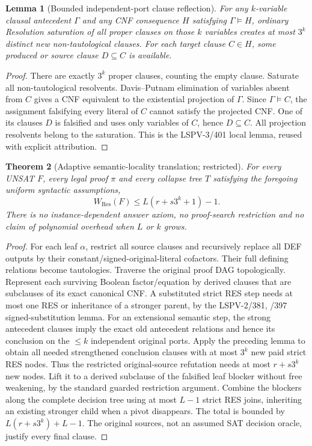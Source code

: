\documentclass[11pt]{article}
\newtheorem{theorem}{Theorem}
\newtheorem{lemma}[theorem]{Lemma}
\begin{document}
\begin{lemma}[Bounded independent-port clause reflection]
For any \(k\)-variable clausal antecedent \(\Gamma\) and any CNF consequence \(H\) satisfying \(\Gamma\models H\), ordinary Resolution saturation of all proper clauses on those \(k\) variables creates at most \(3^k\) distinct new non-tautological clauses. For each target clause \(C\in H\), some produced or source clause \(D\subseteq C\) is available.
\end{lemma}
\begin{proof} There are exactly \(3^k\) proper clauses, counting the empty clause. Saturate all non-tautological resolvents. Davis--Putnam elimination of variables absent from \(C\) gives a CNF equivalent to the existential projection of \(\Gamma\). Since \(\Gamma\models C\), the assignment falsifying every literal of \(C\) cannot satisfy the projected CNF. One of its clauses \(D\) is falsified and uses only variables of \(C\), hence \(D\subseteq C\). All projection resolvents belong to the saturation. This is the LSPV-3/401 local lemma, reused with explicit attribution.
\end{proof}

\begin{theorem}[Adaptive semantic-locality translation; restricted]
For \emph{every} UNSAT \(F\), \emph{every} legal proof \(\pi\) and \emph{every} collapse tree \(T\) satisfying the foregoing uniform syntactic assumptions,
\[
\boxed{W_{\mathrm{Res}}(F)\le L(r+s3^k+1)-1.}
\]
There is no instance-dependent answer axiom, no proof-search restriction and no claim of polynomial overhead when \(L\) or \(k\) grows.
\end{theorem}
\begin{proof} For each leaf \(\alpha\), restrict all source clauses and recursively replace all DEF outputs by their constant/signed-original-literal cofactors. Their full defining relations become tautologies. Traverse the original proof DAG topologically. Represent each surviving Boolean factor/equation by derived clauses that are subclauses of its exact canonical CNF. A substituted strict RES step needs at most one RES or inheritance of a stronger parent, by the LSPV-2/381, /397 signed-substitution lemma. For an extensional semantic step, the strong antecedent clauses imply the exact old antecedent relations and hence its conclusion on the \(\le k\) independent original ports. Apply the preceding lemma to obtain all needed strengthened conclusion clauses with at most \(3^k\) new paid strict RES nodes. Thus the restricted original-source refutation needs at most \(r+s3^k\) new nodes. Lift it to a derived subclause of the falsified leaf blocker without free weakening, by the standard guarded restriction argument. Combine the blockers along the complete decision tree using at most \(L-1\) strict RES joins, inheriting an existing stronger child when a pivot disappears. The total is bounded by \(L(r+s3^k)+L-1\). The original sources, not an assumed SAT decision oracle, justify every final clause.
\end{proof}
\end{document}
